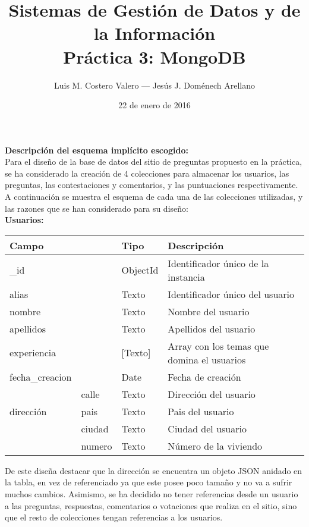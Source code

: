 \documentclass[11pt,a4paper]{article}
\title{Sistemas de Gestión de Datos y de la Información\\Práctica 3:
  MongoDB}
\author{Luis M. Costero Valero --- Jesús J. Doménech Arellano}
\date{22 de enero de 2016}
\begin{document}
 
\maketitle

\textbf{Descripción del esquema implícito escogido:}\\
Para el diseño de la base de datos del sitio de preguntas propuesto en la
práctica, se ha considerado la creación de 4 colecciones para almacenar los
usuarios, las preguntas, las contestaciones y comentarios, y las
puntuaciones respectivamente.
A continuación se muestra el esquema de cada una de las colecciones
utilizadas, y las razones que se han considerado para su diseño:\\

\textbf{Usuarios:}\\

\begin{table}[h] \centering
  \begin{tabular}{@{}llll@{}} \toprule 
    Campo && Tipo & Descripción \\ \midrule 
    \_id            && ObjectId & Identificador único de la instancia \\
    alias           && Texto & Identificador único del usuario \\
    nombre          && Texto & Nombre del usuario \\
    apellidos       && Texto & Apellidos del usuario \\
    experiencia     && [Texto] & Array con los temas que domina el usuarios \\
    fecha\_creacion && Date & Fecha de creación \\
              & \multicolumn{1}{|l}{calle} & Texto & Dirección del usuario \\
    dirección & \multicolumn{1}{|l}{pais} & Texto & Pais del usuario \\
              & \multicolumn{1}{|l}{ciudad} & Texto & Ciudad del usuario \\
              & \multicolumn{1}{|l}{numero} & Texto & Número de la viviendo \\
    \bottomrule
\end{tabular}
\end{table}


De este diseña destacar que la dirección se encuentra un objeto JSON
anidado en la tabla, en vez de referenciado ya que este posee poco tamaño y
no va a sufrir muchos cambios. Asimismo, se ha decidido no tener
referencias desde un usuario a las preguntas, respuestas, comentarios o
votaciones que realiza en el sitio, sino que el resto de colecciones tengan
referencias a los usuarios.\\
\end{document}
